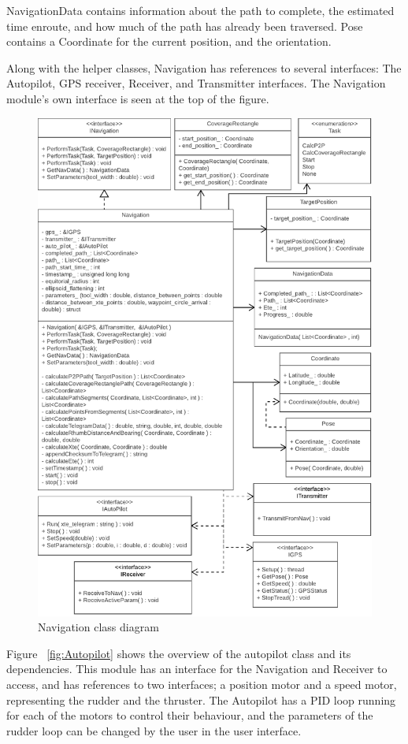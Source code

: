 NavigationData contains information about the path to complete, the estimated time enroute, and how much of the path has already been traversed. Pose contains a Coordinate for the current position, and the orientation. 

Along with the helper classes, Navigation has references to several interfaces: The Autopilot, GPS receiver, Receiver, and Transmitter interfaces. The Navigation module's own interface is seen at the top of the figure.

\begin{figure}[H]
\centering
\includegraphics[max width=1\linewidth]{Navigation_class_diagram}
\caption{Navigation class diagram}
\label{fig:Navigation}
\end{figure}

Figure ~\ref{fig:Autopilot} shows the overview of the autopilot class and its dependencies. This module has an interface for the Navigation and Receiver to access, and has references to two interfaces; a position motor and a speed motor, representing the rudder and the thruster. The Autopilot has a PID loop running for each of the motors to control their behaviour, and the parameters of the rudder loop can be changed by the user in the user interface.

